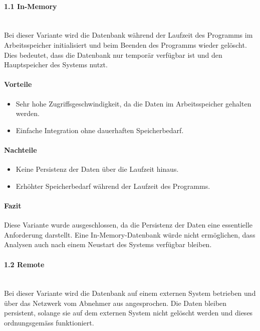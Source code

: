 \documentclass[a4paper,12pt]{report}
\begin{document}
    \paragraph*{1.1 In-Memory}\mbox{}\\
    Bei dieser Variante wird die Datenbank während der Laufzeit des Programms im Arbeitsspeicher initialisiert und beim Beenden des Programms wieder gelöscht.
    Dies bedeutet, dass die Datenbank nur temporär verfügbar ist und den Hauptspeicher des Systems nutzt.

    \paragraph*{Vorteile}
    \begin{itemize}
        \item Sehr hohe Zugriffsgeschwindigkeit, da die Daten im Arbeitsspeicher gehalten werden.
        \item Einfache Integration ohne dauerhaften Speicherbedarf.
    \end{itemize}

    \paragraph*{Nachteile}
    \begin{itemize}
        \item Keine Persistenz der Daten über die Laufzeit hinaus.
        \item Erhöhter Speicherbedarf während der Laufzeit des Programms.
    \end{itemize}

    \paragraph*{Fazit}
    Diese Variante wurde ausgeschlossen, da die Persistenz der Daten eine essentielle Anforderung darstellt.
    Eine In-Memory-Datenbank würde nicht ermöglichen, dass Analysen auch nach einem Neustart des Systems verfügbar bleiben.

    \paragraph*{1.2 Remote}\mbox{}\\
    Bei dieser Variante wird die Datenbank auf einem externen System betrieben und über das Netzwerk vom Abnehmer aus angesprochen.
    Die Daten bleiben persistent, solange sie auf dem externen System nicht gelöscht werden und dieses ordnungsgemäss funktioniert.
\end{document}
